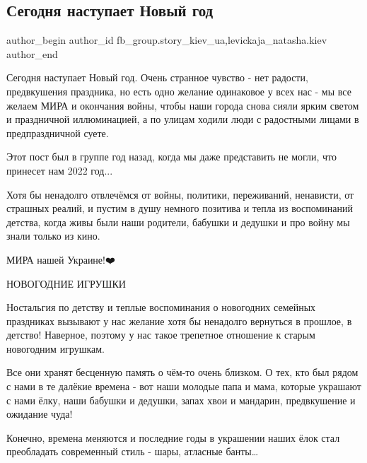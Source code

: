  
 
 
 
 
 
\subsection{Сегодня наступает Новый год}
\label{sec:31_12_2022.fb.fb_group.story_kiev_ua.1.novyj_god_igrushki}
 
\ifcmt
 author_begin
   author_id fb_group.story_kiev_ua,levickaja_natasha.kiev
 author_end
\fi

Сегодня наступает Новый год. Очень странное чувство - нет радости, предвкушения
праздника, но есть одно желание одинаковое у всех нас - мы все желаем МИРА и
окончания войны,  чтобы наши города снова сияли ярким светом и праздничной
иллюминацией, а по улицам ходили люди с радостными лицами в предпраздничной
суете.

Этот пост был  в группе год назад, когда мы даже представить не могли, что
принесет нам 2022 год...

Хотя  бы ненадолго отвлечёмся от войны, политики, переживаний, ненависти, от
страшных реалий, и пустим в душу немного позитива и тепла из воспоминаний
детства, когда живы были наши родители, бабушки и дедушки и про войну мы знали
только из кино.

МИРА нашей Украине!❤️💛💙

НОВОГОДНИЕ ИГРУШКИ 

Ностальгия по детству и теплые воспоминания о новогодних семейных праздниках
вызывают у нас желание хотя бы ненадолго вернуться в прошлое, в детство!
Наверное, поэтому у нас  такое трепетное отношение к старым новогодним
игрушкам.

Все они  хранят бесценную память  о чём-то  очень  близком. О тех, кто был
рядом с нами в те далёкие времена - вот наши молодые папа и мама, которые
украшают с нами ёлку, наши бабушки и дедушки, запах хвои и мандарин,
предвкушение и ожидание чуда!

Конечно, времена меняются и  последние годы в украшении наших ёлок стал
преобладать современный стиль - шары, атласные банты…

